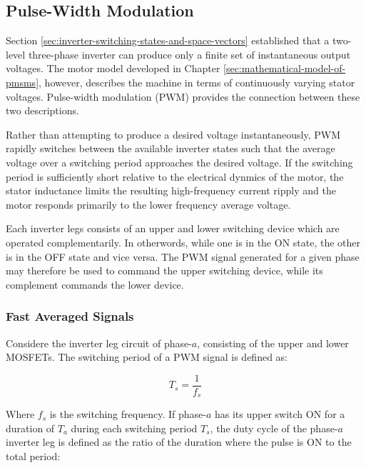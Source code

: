 \documentclass{article}
\begin{document}
\subsection{Pulse-Width Modulation}
\label{sec:pulse-width-modulation}

Section \ref{sec:inverter-switching-states-and-space-vectors} established that a two-level three-phase inverter can produce only a finite set of instantaneous output voltages. The motor model developed in Chapter \ref{sec:mathematical-model-of-pmsms}, however, describes the machine in terms of continuously varying stator voltages. Pulse-width modulation (PWM) provides the connection between these two descriptions.

Rather than attempting to produce a desired voltage instantaneously, PWM rapidly switches between the available inverter states such that the average voltage over a switching period approaches the desired voltage. If the switching period is sufficiently short relative to the electrical dynmics of the motor, the stator inductance limits the resulting high-frequency current ripply and the motor responds primarily to the lower frequency average voltage.

Each inverter legs consists of an upper and lower switching device which are operated complementarily. In otherwords, while one is in the ON state, the other is in the OFF state and vice versa. The PWM signal generated for a given phase may therefore be used to command the upper switching device, while its complement commands the lower device.

\subsubsection{Fast Averaged Signals}
\label{sec:fast-averaged-signals}

Considere the inverter leg circuit of phase-$a$, consisting of the upper and lower MOSFETs. The switching period of a PWM signal is defined as:

\begin{equation}
    T_s = \frac{1}{f_s}
\end{equation}

Where $f_s$ is the switching frequency. If phase-$a$ has its upper switch ON for a duration of $T_a$ during each switching period $T_s$, the duty cycle of the phase-$a$ inverter leg is defined as the ratio of the duration where the pulse is ON to the total period:
\end{document}
